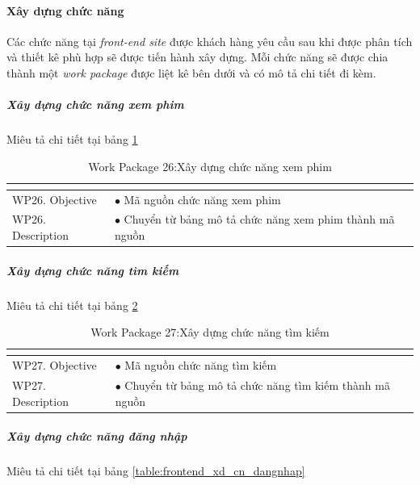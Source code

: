 \documentclass[a4paper]{book}
\begin{document}
\paragraph{Xây dựng chức năng}
Các chức năng tại \textit{front-end site} được khách hàng yêu cầu sau khi được phân tích và thiết kê phù hợp sẽ được tiến hành xây dựng. Mỗi chức năng sẽ được chia thành một \textit{work package} được liệt kê bên dưới và có mô tả chi tiết đi kèm.
\subparagraph{Xây dựng chức năng xem phim} Miêu tả chi tiết tại bảng \ref{table:frontend_xd_cn_xemphim}
\begin{table}[h!]
	\begin{center}
		\begin{tabular}{|p{4cm}|p{10cm}|}
			\hline
			\multicolumn{2}{|c|}{\cellcolor[HTML]{363636}{\color[HTML]{FFFFFF}Work package 26: Xây dựng chức năng xem phim}}\\
			\hline
			\multirow{1}{*}{WP26. Objective} & $\bullet$ Mã nguồn chức năng xem phim\\
			\hline
			\multirow{1}{*}{WP26. Description} & $\bullet$ Chuyển từ bảng mô tả chức năng xem phim thành mã nguồn \\
			\hline
		\end{tabular}
		\caption{Work Package 26:Xây dựng chức năng xem phim}
		\label{table:frontend_xd_cn_xemphim}
	\end{center}
\end{table}
\subparagraph{Xây dựng chức năng tìm kiếm} Miêu tả chi tiết tại bảng \ref{table:frontend_xd_cn_timkiem}
\begin{table}[h!]
	\begin{center}
		\begin{tabular}{|p{4cm}|p{10cm}|}
			\hline
			\multicolumn{2}{|c|}{\cellcolor[HTML]{363636}{\color[HTML]{FFFFFF}Work package 27: Xây dựng chức năng tìm kiếm}}\\
			\hline
			\multirow{1}{*}{WP27. Objective} & $\bullet$ Mã nguồn chức năng tìm kiếm\\
			\hline
			\multirow{1}{*}{WP27. Description} & $\bullet$ Chuyển từ bảng mô tả chức năng tìm kiếm thành mã nguồn \\
			\hline
		\end{tabular}
		\caption{Work Package 27:Xây dựng chức năng tìm kiếm}
		\label{table:frontend_xd_cn_timkiem}
	\end{center}
\end{table}
\subparagraph{Xây dựng chức năng đăng nhập} Miêu tả chi tiết tại bảng \ref{table:frontend_xd_cn_dangnhap}
\end{document}
